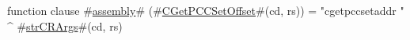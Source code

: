 function clause #\hyperref[sailMIPSzassembly]{assembly}# (#\hyperref[sailMIPSzCGetPCCSetOffset]{CGetPCCSetOffset}#(cd, rs)) = "cgetpccsetaddr " ^ #\hyperref[sailMIPSzstrCRArgs]{strCRArgs}#(cd, rs)
